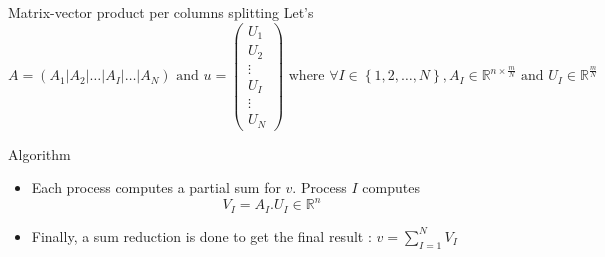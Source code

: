 \documentclass[compress,10pt,aspectratio=169]{beamer}
\begin{document}
\begin{frame}[fragile]{Matrix-vector product per columns splitting}
  \scriptsize
  Let's
  \[
    A = \left(A_{1}|A_{2}|\ldots|A_{I}|\ldots|A_{N}\right)\mbox{ and }
    u=\left(\begin{array}{c}
      U_{1} \\ \hline
      U_{2} \\ \hline
      \vdots \\ \hline
      U_{I} \\ \hline
      \vdots \\ \hline
      U_{N}
    \end{array} \right)
    \mbox{ where } \forall I\in\left\{1,2,\ldots,N\right\}, A_{I}\in\mathbb{R}^{n\times \frac{m}{N}}\mbox{ and } U_{I}\in\mathbb{R}^{\frac{m}{N}}
    \]

    \begin{exampleblock}{Algorithm}
      \begin{itemize}
      \item Each process computes a partial sum for $v$. Process $I$ computes
        \[
        V_{I} = A_{I}.U_{I}\in\mathbb{R}^{n}
        \]
      \item Finally, a sum reduction is done to get the final result :
        $\displaystyle
        v = \sum_{I=1}^{N}V_{I}
        $
      \end{itemize}
    \end{exampleblock}
    
\end{frame}
\end{document}
